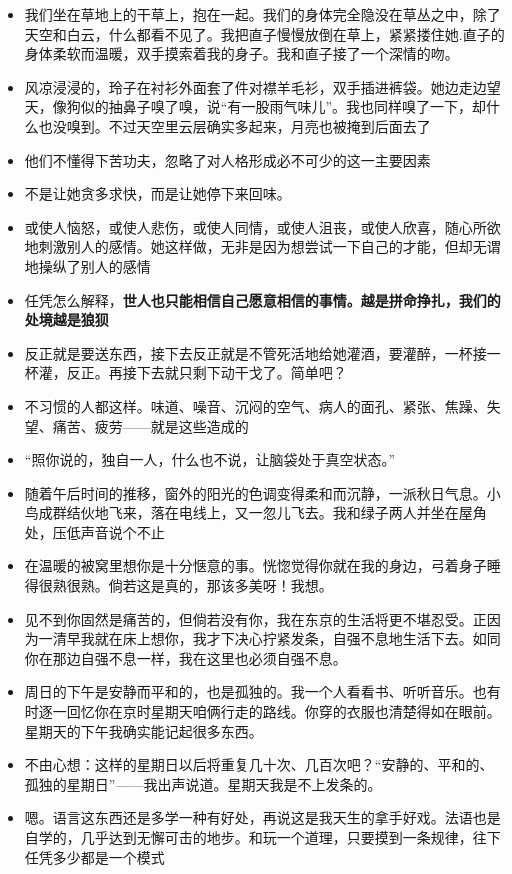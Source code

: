 \documentclass[UTF8,a4paper,8pt]{ctexbook}
\begin{document}
\begin{itemize}
		\item 我们坐在草地上的干草上，抱在一起。我们的身体完全隐没在草丛之中，除了天空和白云，什么都看不见了。我把直子慢慢放倒在草上，紧紧搂住她.直子的身体柔软而温暖，双手摸索着我的身子。我和直子接了一个深情的吻。
		\item 风凉浸浸的，玲子在衬衫外面套了件对襟羊毛衫，双手插进裤袋。她边走边望天，像狗似的抽鼻子嗅了嗅，说“有一股雨气味儿”。我也同样嗅了一下，却什么也没嗅到。不过天空里云层确实多起来，月亮也被掩到后面去了
		\item 他们不懂得下苦功夫，忽略了对人格形成必不可少的这一主要因素
		\item 不是让她贪多求快，而是让她停下来回味。
		\item 或使人恼怒，或使人悲伤，或使人同情，或使人沮丧，或使人欣喜，随心所欲地刺激别人的感情。她这样做，无非是因为想尝试一下自己的才能，但却无谓地操纵了别人的感情
		\item 任凭怎么解释，\textbf{世人也只能相信自己愿意相信的事情。越是拼命挣扎，我们的处境越是狼狈}
		\item 反正就是要送东西，接下去反正就是不管死活地给她灌酒，要灌醉，一杯接一杯灌，反正。再接下去就只剩下动干戈了。简单吧？
		\item 不习惯的人都这样。味道、噪音、沉闷的空气、病人的面孔、紧张、焦躁、失望、痛苦、疲劳——就是这些造成的
		\item “照你说的，独自一人，什么也不说，让脑袋处于真空状态。”
		\item 随着午后时间的推移，窗外的阳光的色调变得柔和而沉静，一派秋日气息。小鸟成群结伙地飞来，落在电线上，又一忽儿飞去。我和绿子两人并坐在屋角处，压低声音说个不止
		\item 在温暖的被窝里想你是十分惬意的事。恍惚觉得你就在我的身边，弓着身子睡得很熟很熟。倘若这是真的，那该多美呀！我想。
		\item 见不到你固然是痛苦的，但倘若没有你，我在东京的生活将更不堪忍受。正因为一清早我就在床上想你，我才下决心拧紧发条，自强不息地生活下去。如同你在那边自强不息一样，我在这里也必须自强不息。
		\item 周日的下午是安静而平和的，也是孤独的。我一个人看看书、听听音乐。也有时逐一回忆你在京时星期天咱俩行走的路线。你穿的衣服也清楚得如在眼前。星期天的下午我确实能记起很多东西。
		\item 不由心想：这样的星期日以后将重复几十次、几百次吧？“安静的、平和的、孤独的星期日”——我出声说道。星期天我是不上发条的。
		\item 嗯。语言这东西还是多学一种有好处，再说这是我天生的拿手好戏。法语也是自学的，几乎达到无懈可击的地步。和玩一个道理，只要摸到一条规律，往下任凭多少都是一个模式

\end{itemize}
\end{document}
